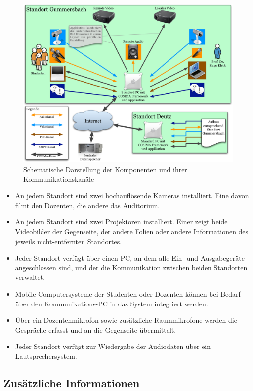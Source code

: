   \begin{figure}[ht]
    \centering
      \includegraphics[width=.9\textwidth]{images/Hardware_und_Kanaele.pdf}
    \caption{Schematische Darstellung der Komponenten und ihrer Kommunikationskanäle}
    \label{fig:images_Hardware_und_Kanaele}
  \end{figure}
  
  \begin{itemize}
    \item An jedem Standort sind zwei hochauflösende Kameras installiert. Eine davon filmt den Dozenten, die andere das Auditorium.
    \item An jedem Standort sind zwei Projektoren installiert. Einer zeigt beide Videobilder der Gegenseite, der andere Folien oder andere Informationen des jeweils nicht-entfernten Standortes.
    \item Jeder Standort verfügt über einen PC, an dem alle Ein- und Ausgabegeräte angeschlossen sind, und der die Kommunikation zwischen beiden Standorten verwaltet.
    \item Mobile Computersysteme der Studenten oder Dozenten können bei Bedarf über den Kommunikations-PC in das System integriert werden.
    \item Über ein Dozentenmikrofon sowie zusätzliche Raummikrofone werden die Gespräche erfasst und an die Gegenseite übermittelt.
    \item Jeder Standort verfügt zur Wiedergabe der Audiodaten über ein Lautsprechersystem.
  \end{itemize}

  
\subsection{Zusätzliche Informationen} %
\label{sub:zusaetzliche_informationen}


